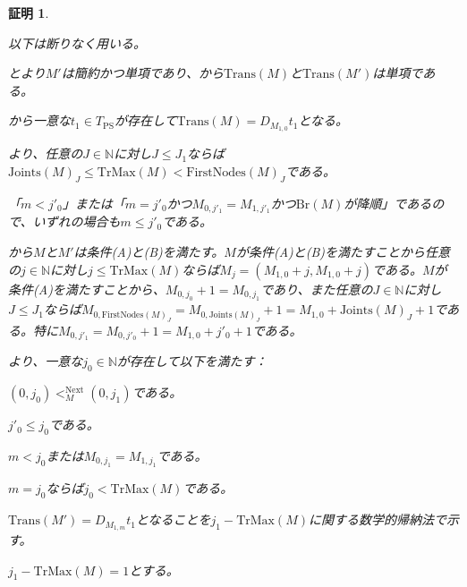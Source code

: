\documentclass[dvipdfmx,uplatex]{jsarticle}
\theoremstyle{customnonumberbreakfortheorem}
\theoremstyle{customnonumberbreakforproof}
\newtheorem{hideableproof}{証明}
\begin{document}
\begin{hideableproof}
	\begin{indented}
		\item 以下は断りなく用いる。
		\item {}とより\(M'\)は簡約かつ単項であり、から\(\textrm{Trans}(M)\)と\(\textrm{Trans}(M')\)は単項である。
		\item {}から一意な\(t_1 \in T_{\textrm{PS}}\)が存在して\(\textrm{Trans}(M) = D_{M_{1,0}} t_1\)となる。
		\item {}より、任意の\(J \in \mathbb{N}\)に対し\(J \leq J_1\)ならば\(\textrm{Joints}(M)_J \leq \textrm{TrMax}(M) < \textrm{FirstNodes}(M)_J\)である。
		\item 「\(m < j'_0\)」または「\(m = j'_0\)かつ\(M_{0,j'_1} = M_{1,j'_1}\)かつ\(\textrm{Br}(M)\)が降順」であるので、いずれの場合も\(m \leq j'_0\)である。
		\item {}から\(M\)と\(M'\)は条件(A)と(B)を満たす。\(M\)が条件(A)と(B)を満たすことから任意の\(j \in \mathbb{N}\)に対し\(j \leq \textrm{TrMax}(M)\)ならば\(M_j = (M_{1,0} + j, M_{1,0} + j)\)である。\(M\)が条件(A)を満たすことから、\(M_{0,j_0}+1 = M_{0,j_1}\)であり、また任意の\(J \in \mathbb{N}\)に対し\(J \leq J_1\)ならば\(M_{0,\textrm{FirstNodes}(M)_J} = M_{0,\textrm{Joints}(M)_J} + 1 = M_{1,0} + \textrm{Joints}(M)_J + 1\)である。特に\(M_{0,j'_1} = M_{0,j'_0}+1 = M_{1,0} + j'_0 + 1\)である。
		\item {}より、一意な\(j_0 \in \mathbb{N}\)が存在して以下を満たす：
		\begin{penumerate}
			\item \((0,j_0) <_M^{\textrm{Next}} (0,j_1)\)である。
			\item \(j'_0 \leq j_0\)である。
			\item \(m < j_0\)または\(M_{0,j_1} = M_{1,j_1}\)である。
			\item \(m = j_0\)ならば\(j_0 < \textrm{TrMax}(M)\)である。
		\end{penumerate}
		\item
		\item \(\textrm{Trans}(M') = D_{M_{1,m}} t_1\)となることを\(j_1 - \textrm{TrMax}(M)\)に関する数学的帰納法で示す。
		\item \(j_1 - \textrm{TrMax}(M) = 1\)とする。
		\begin{indented}

\end{indented}
\end{indented}
\end{hideableproof}
\end{document}

